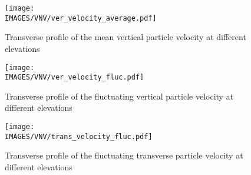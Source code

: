 \clearpage
\begin{figure}[H]
\centerline{\texttt{[image: \\IMAGES/VNV/ver\_velocity\_average.pdf]}}
\caption{{Transverse profile of the mean vertical particle velocity at different elevations}}
\label{meanver}
\end{figure}

\clearpage
\begin{figure}[H]
\centerline{\texttt{[image: \\IMAGES/VNV/ver\_velocity\_fluc.pdf]}}
\caption{{Transverse profile of the fluctuating vertical particle velocity at different elevations}}
\label{flucver}
\end{figure}

\clearpage

\clearpage
\begin{figure}[H]
\centerline{\texttt{[image: \\IMAGES/VNV/trans\_velocity\_fluc.pdf]}}
\caption{{Transverse profile of the fluctuating transverse particle velocity at different elevations}}
\label{fluctrans}
\end{figure}


